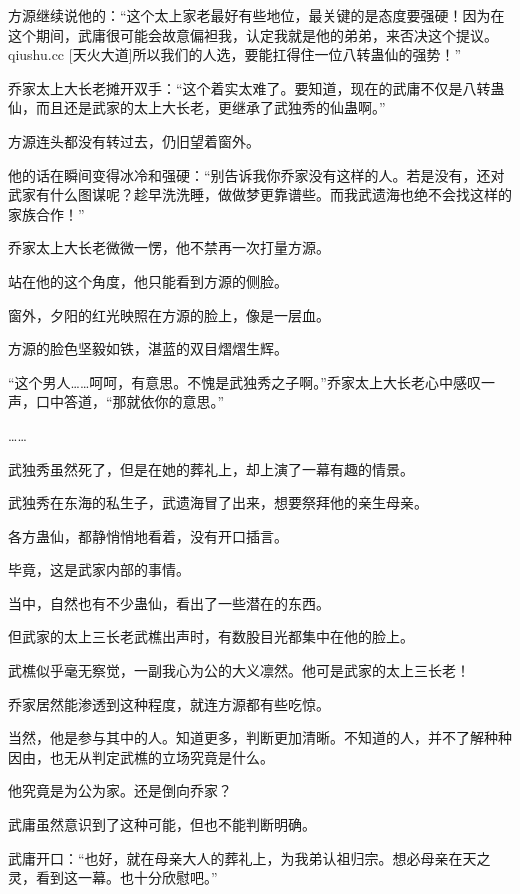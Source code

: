 
\begin{this_body}

方源继续说他的：“这个太上家老最好有些地位，最关键的是态度要强硬！因为在这个期间，武庸很可能会故意偏袒我，认定我就是他的弟弟，来否决这个提议。qiushu.cc [天火大道]所以我们的人选，要能扛得住一位八转蛊仙的强势！”

乔家太上大长老摊开双手：“这个着实太难了。要知道，现在的武庸不仅是八转蛊仙，而且还是武家的太上大长老，更继承了武独秀的仙蛊啊。”

方源连头都没有转过去，仍旧望着窗外。

他的话在瞬间变得冰冷和强硬：“别告诉我你乔家没有这样的人。若是没有，还对武家有什么图谋呢？趁早洗洗睡，做做梦更靠谱些。而我武遗海也绝不会找这样的家族合作！”

乔家太上大长老微微一愣，他不禁再一次打量方源。

站在他的这个角度，他只能看到方源的侧脸。

窗外，夕阳的红光映照在方源的脸上，像是一层血。

方源的脸色坚毅如铁，湛蓝的双目熠熠生辉。

“这个男人……呵呵，有意思。不愧是武独秀之子啊。”乔家太上大长老心中感叹一声，口中答道，“那就依你的意思。”

……

武独秀虽然死了，但是在她的葬礼上，却上演了一幕有趣的情景。

武独秀在东海的私生子，武遗海冒了出来，想要祭拜他的亲生母亲。

各方蛊仙，都静悄悄地看着，没有开口插言。

毕竟，这是武家内部的事情。

当中，自然也有不少蛊仙，看出了一些潜在的东西。

但武家的太上三长老武樵出声时，有数股目光都集中在他的脸上。

武樵似乎毫无察觉，一副我心为公的大义凛然。他可是武家的太上三长老！

乔家居然能渗透到这种程度，就连方源都有些吃惊。

当然，他是参与其中的人。知道更多，判断更加清晰。不知道的人，并不了解种种因由，也无从判定武樵的立场究竟是什么。

他究竟是为公为家。还是倒向乔家？

武庸虽然意识到了这种可能，但也不能判断明确。

武庸开口：“也好，就在母亲大人的葬礼上，为我弟认祖归宗。想必母亲在天之灵，看到这一幕。也十分欣慰吧。”


\end{this_body}
